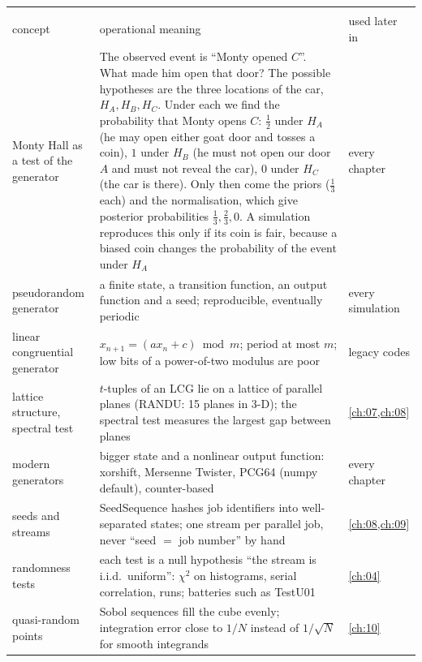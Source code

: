 \begin{center}
\small
\renewcommand{\arraystretch}{1.15}
\begin{tabularx}{\linewidth}{@{}>{\raggedright\arraybackslash}p{3.3cm}
                               >{\raggedright\arraybackslash}X
                               >{\raggedright\arraybackslash}p{2.5cm}@{}}
\toprule
\multicolumn{3}{@{}l}{\textbf{Random numbers on a deterministic machine}}\\
concept & operational meaning & used later in\\\midrule
Monty Hall as a test of the generator & The observed event is ``Monty opened $C$''. What made him open that door? The possible hypotheses are the three locations of the car, $H_A,H_B,H_C$. Under each we find the probability that Monty opens $C$: $\tfrac12$ under $H_A$ (he may open either goat door and tosses a coin), $1$ under $H_B$ (he must not open our door $A$ and must not reveal the car), $0$ under $H_C$ (the car is there). Only then come the priors ($\tfrac13$ each) and the normalisation, which give posterior probabilities $\tfrac13,\tfrac23,0$. A simulation reproduces this only if its coin is fair, because a biased coin changes the probability of the event under $H_A$ & every chapter\\
pseudorandom generator & a finite state, a transition function, an output function and a seed; reproducible, eventually periodic & every simulation\\
linear congruential generator & $x_{n+1}=(ax_n+c)\bmod m$; period at most $m$; low bits of a power-of-two modulus are poor & legacy codes\\
lattice structure, spectral test & $t$-tuples of an LCG lie on a lattice of parallel planes (RANDU: 15 planes in 3-D); the spectral test measures the largest gap between planes & \cref{ch:07,ch:08}\\
modern generators & bigger state and a nonlinear output function: xorshift, Mersenne Twister, PCG64 (numpy default), counter-based & every chapter\\
seeds and streams & SeedSequence hashes job identifiers into well-separated states; one stream per parallel job, never ``seed $=$ job number'' by hand & \cref{ch:08,ch:09}\\
randomness tests & each test is a null hypothesis ``the stream is i.i.d.\ uniform'': $\chi^2$ on histograms, serial correlation, runs; batteries such as TestU01 & \cref{ch:04}\\
quasi-random points & Sobol sequences fill the cube evenly; integration error close to $1/N$ instead of $1/\sqrt N$ for smooth integrands & \cref{ch:10}\\
\bottomrule
\end{tabularx}
\end{center}

